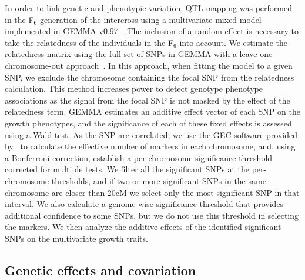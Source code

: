 \begin{refsection}
In order to link genetic and phenotypic variation, QTL mapping was performed
in the F$_{\text{6}}$ generation of the intercross using a multivariate mixed
model implemented in GEMMA v0.97~\parencite{Zhou2014-op}. The inclusion of a
random effect is necessary to take the relatedness of the individuals in the
F$_{\text{6}}$ into account. We estimate the relatedness matrix using the full
set of SNPs in GEMMA with a leave-one-chromosome-out
approach~\parencite{Yang2014-hl}. In this approach, when fitting the model to
a given SNP, we exclude the chromosome containing the focal SNP from the
relatedness calculation. This method increases power to detect genotype
phenotype associations as the signal from the focal SNP is not masked by the
effect of the relatedness term. GEMMA estimates an additive effect vector of each SNP
on the growth phenotypes, and the significance of each of these fixed effects
is assessed using a Wald test. As the SNP are correlated, we use the GEC
software provided by~\textcite{Li2012-wl} to calculate the effective number of
markers in each chromosome, and, using a Bonferroni correction, establish a
per-chromosome significance threshold corrected for multiple tests. We filter
all the significant SNPs at the per-chromosome thresholds, and if two or more
significant SNPs in the same chromosome are closer than 20cM we select only
the most significant SNP in that interval. We also calculate a genome-wise
significance threshold that provides additional confidence to some SNPs, but
we do not use this threshold in selecting the markers. We then analyze the
additive effects of the identified significant SNPs on the multivariate growth
traits.

\subsection{Genetic effects and covariation}


\end{refsection}
